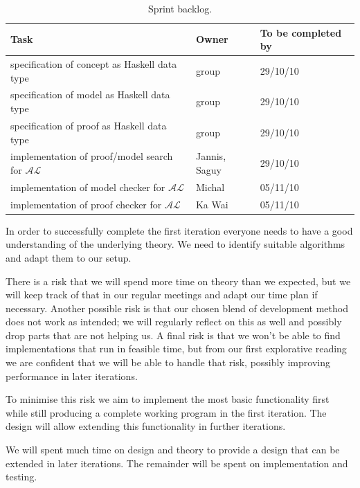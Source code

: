 
\begin{table}
  \caption{Sprint backlog.}
  \begin{tabular}{l|l|l}
    \hline
    \textbf{Task} & \textbf{Owner} & \textbf{To be completed by} \\
    \hline
    specification of concept as Haskell data type & group & 29/10/10 \\
    specification of model as Haskell data type & group & 29/10/10 \\
    specification of proof as Haskell data type & group & 29/10/10 \\
    implementation of proof/model search for $\mathcal{AL}$ & Jannis, Saguy & 29/10/10 \\
    implementation of model checker for $\mathcal{AL}$ & Michal & 05/11/10 \\
    implementation of proof checker for $\mathcal{AL}$ & Ka Wai & 05/11/10
  \end{tabular}
  \label{sprint}
\end{table}


In order to successfully complete the first iteration everyone needs to have a good
understanding of the underlying theory. We need to identify suitable algorithms and
adapt them to our setup. 

There is a risk that we will spend more time on theory than we expected, but we will keep
track of that in our regular meetings and adapt our time plan if necessary.
Another possible risk is that our chosen blend
of development method does not work as intended; we will regularly reflect on this as well
and possibly drop parts that are not helping us. A final risk is that we won't be able
to find implementations that run in feasible time, but from our first explorative reading
we are confident that we will be able to handle that risk, possibly improving performance
in later iterations.


To minimise this risk we aim to implement the most basic functionality first while
still producing a complete working program in the first iteration. The design will
allow extending this functionality in further iterations.

We will spent much time on design and theory to provide a design that can be extended
in later iterations. The remainder will be spent on implementation and testing.

